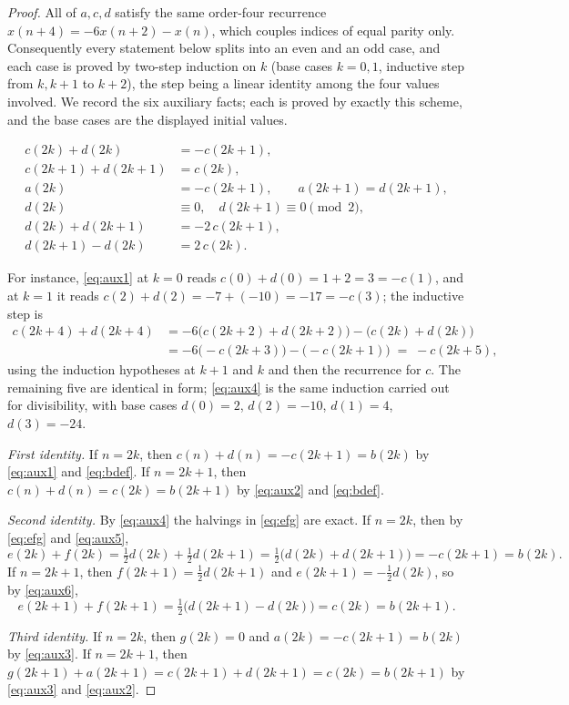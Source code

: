 \documentclass[11pt]{article}
\theoremstyle{plain}
\theoremstyle{definition}
\theoremstyle{remark}
\numberwithin{equation}{section}
\begin{document}
\begin{proof}
All of $a, c, d$ satisfy the same order-four recurrence $x(n+4) = -6x(n+2) - x(n)$, which
couples indices of equal parity only. Consequently every statement below splits into an even and
an odd case, and each case is proved by two-step induction on $k$ (base cases $k = 0, 1$,
inductive step from $k, k+1$ to $k+2$), the step being a linear identity among the four values
involved. We record the six auxiliary facts; each is proved by exactly this scheme, and the base
cases are the displayed initial values.

\begin{align}
  c(2k) + d(2k) &= -c(2k+1), \label{eq:aux1}\\
  c(2k+1) + d(2k+1) &= c(2k), \label{eq:aux2}\\
  a(2k) &= -c(2k+1), \qquad a(2k+1) = d(2k+1), \label{eq:aux3}\\
  d(2k) &\equiv 0, \quad d(2k+1) \equiv 0 \pmod 2, \label{eq:aux4}\\
  d(2k) + d(2k+1) &= -2\,c(2k+1), \label{eq:aux5}\\
  d(2k+1) - d(2k) &= 2\,c(2k). \label{eq:aux6}
\end{align}

For instance, \eqref{eq:aux1} at $k=0$ reads $c(0)+d(0) = 1+2 = 3 = -c(1)$, and at $k=1$ it reads
$c(2)+d(2) = -7 + (-10) = -17 = -c(3)$; the inductive step is
\begin{align*}
  c(2k+4) + d(2k+4)
  &= -6\bigl(c(2k+2)+d(2k+2)\bigr) - \bigl(c(2k)+d(2k)\bigr)\\
  &= -6\bigl(-c(2k+3)\bigr) - \bigl(-c(2k+1)\bigr) \;=\; -c(2k+5),
\end{align*}
using the induction hypotheses at $k+1$ and $k$ and then the recurrence for $c$. The remaining
five are identical in form; \eqref{eq:aux4} is the same induction carried out for divisibility,
with base cases $d(0) = 2$, $d(2) = -10$, $d(1) = 4$, $d(3) = -24$.

\emph{First identity.} If $n = 2k$, then $c(n)+d(n) = -c(2k+1) = b(2k)$ by \eqref{eq:aux1} and
\eqref{eq:bdef}. If $n = 2k+1$, then $c(n)+d(n) = c(2k) = b(2k+1)$ by \eqref{eq:aux2} and
\eqref{eq:bdef}.

\emph{Second identity.} By \eqref{eq:aux4} the halvings in \eqref{eq:efg} are exact. If
$n = 2k$, then by \eqref{eq:efg} and \eqref{eq:aux5},
\[
  e(2k) + f(2k) = \tfrac12 d(2k) + \tfrac12 d(2k+1) = \tfrac12\bigl(d(2k)+d(2k+1)\bigr)
  = -c(2k+1) = b(2k).
\]
If $n = 2k+1$, then $f(2k+1) = \tfrac12 d(2k+1)$ and $e(2k+1) = -\tfrac12 d(2k)$, so by
\eqref{eq:aux6},
\[
  e(2k+1) + f(2k+1) = \tfrac12\bigl(d(2k+1) - d(2k)\bigr) = c(2k) = b(2k+1).
\]

\emph{Third identity.} If $n = 2k$, then $g(2k) = 0$ and $a(2k) = -c(2k+1) = b(2k)$ by
\eqref{eq:aux3}. If $n = 2k+1$, then $g(2k+1) + a(2k+1) = c(2k+1) + d(2k+1) = c(2k) = b(2k+1)$
by \eqref{eq:aux3} and \eqref{eq:aux2}.
\end{proof}
\end{document}
